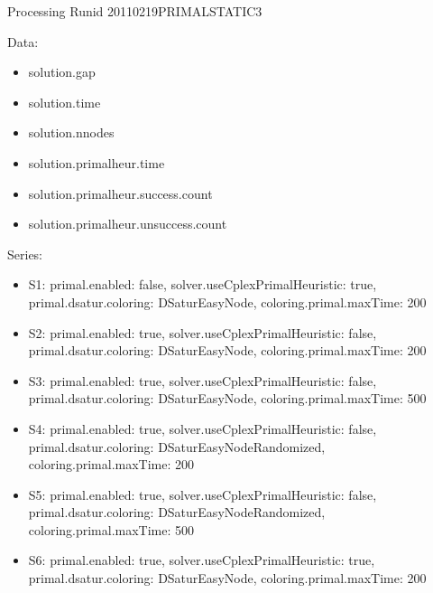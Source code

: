 \documentclass[landscape, 12pt]{report}
\begin{document}
Processing Runid 20110219PRIMALSTATIC3

Data:
\begin{itemize}
\item solution.gap
\item solution.time
\item solution.nnodes
\item solution.primalheur.time
\item solution.primalheur.success.count
\item solution.primalheur.unsuccess.count
\end{itemize}
Series:
\begin{itemize}
\item S1: primal.enabled: false, solver.useCplexPrimalHeuristic: true, primal.dsatur.coloring: DSaturEasyNode, coloring.primal.maxTime: 200
\item S2: primal.enabled: true, solver.useCplexPrimalHeuristic: false, primal.dsatur.coloring: DSaturEasyNode, coloring.primal.maxTime: 200
\item S3: primal.enabled: true, solver.useCplexPrimalHeuristic: false, primal.dsatur.coloring: DSaturEasyNode, coloring.primal.maxTime: 500
\item S4: primal.enabled: true, solver.useCplexPrimalHeuristic: false, primal.dsatur.coloring: DSaturEasyNodeRandomized, coloring.primal.maxTime: 200
\item S5: primal.enabled: true, solver.useCplexPrimalHeuristic: false, primal.dsatur.coloring: DSaturEasyNodeRandomized, coloring.primal.maxTime: 500
\item S6: primal.enabled: true, solver.useCplexPrimalHeuristic: true, primal.dsatur.coloring: DSaturEasyNode, coloring.primal.maxTime: 200
\end{itemize}
\end{document}
